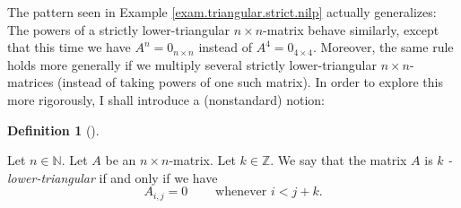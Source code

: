 \documentclass[numbers=enddot,12pt,final,onecolumn,notitlepage]{scrartcl}%
\theoremstyle{definition}
\newtheorem{defi}[theo]{Definition}
\newenvironment{definition}[1][]
{\begin{defi}[#1]\begin{leftbar}}
{\end{leftbar}\end{defi}}
\begin{document}
The pattern seen in Example \ref{exam.triangular.strict.nilp} actually
generalizes: The powers of a strictly lower-triangular $n\times n$-matrix
behave similarly, except that this time we have $A^{n}=0_{n\times n}$ instead
of $A^{4}=0_{4\times4}$. Moreover, the same rule holds more generally if we
multiply several strictly lower-triangular $n\times n$-matrices (instead of
taking powers of one such matrix). In order to explore this more rigorously, I
shall introduce a (nonstandard) notion:

\begin{definition}
\label{def.triangular.strict.k}Let $n\in\mathbb{N}$. Let $A$ be an $n\times
n$-matrix. Let $k\in\mathbb{Z}$. We say that the matrix $A$ is $k$%
\textit{-lower-triangular} if and only if we have%
\[
A_{i,j}=0\ \ \ \ \ \ \ \ \ \ \text{whenever }i<j+k.
\]

\end{definition}
\end{document}
